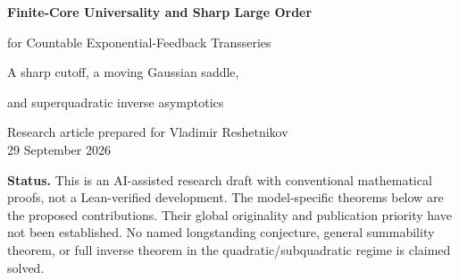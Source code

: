 \documentclass[11pt,a4paper]{article}
\numberwithin{equation}{section}
\theoremstyle{definition}
\theoremstyle{remark}
\newcommand{\Uhat}{\widehat U}\newcommand{\Vhat}{\widehat V}
\begin{document}
\begin{center}
{\LARGE\bfseries\color{ink} Finite-Core Universality and Sharp Large Order\par for Countable Exponential-Feedback Transseries\par}
\vspace{0.6em}
{\large A sharp cutoff, a moving Gaussian saddle,\par and superquadratic inverse asymptotics\par}
\vspace{0.85em}
Research article prepared for Vladimir Reshetnikov\\
29 September 2026
\end{center}

\begin{abstract}
For the formal equation
\[
 \Uhat(q)=\sum_{j\ge1}q^j\exp\!\bigl(a j^p\Uhat(q)\bigr),
 \qquad a>0,\quad p>1,
\]
we pass from logarithmic large-order estimates to a full multiplicative
coefficient equivalent. The main step is a sharp finite-core reduction.
Keep actions $1,\ldots,M$ in an analytic implicit core, and retain exactly
one further action through its linear response. The coefficients of this
one-tail series are asymptotic to those of $\Uhat$ if and only if
$M(p-1)>1$. At equality the ratio tends to zero, not one. A coupled
small-radius/large-action saddle then gives the full exponential factor
and determinant prefactor using only the finite core. It also yields a
conditional local Gaussian law and an unconditional central limit theorem
for the largest action, centered at an explicitly defined moving saddle,
with standard deviation asymptotic to
$\sqrt{pn}/((p-1)\log n)$.

The result allows nonnegative changes to finitely many initial slopes and
weights, with the first weight kept equal to one. For $p>2$ the finite core disappears from the leading
multiplicative equivalent. For $p=2$ a factor
$\exp((1+1/a)r_n^2)$ survives, where
$r_n(1+r_n)e^{2r_n}=an$; discarding it produces an unbounded relative error.
For $p>2$ we additionally prove a sharp formal-reversion law,
$v_n=-u_n+(n+1)u_2u_{n-1}+o(nu_{n-1})$.
The proofs are self-contained apart from elementary analytic and formal
power-series tools. Exact coefficient checks, numerical saddle diagnostics,
a proof-dependency audit, and a further research program accompany the text.
\end{abstract}

\noindent\textbf{Status.}
This is an AI-assisted research draft with conventional mathematical proofs,
not a Lean-verified development. The model-specific theorems below are the
proposed contributions. Their global originality and publication priority
have not been established. No named longstanding conjecture, general
summability theorem, or full inverse theorem in the quadratic/subquadratic
regime is claimed solved.
\end{document}
